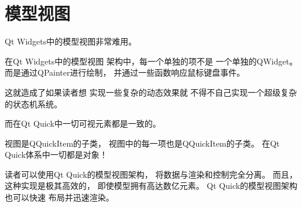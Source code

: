 ﻿




\cleardoublepage
\chapter{
模型视图
}\label{c000019}


Qt Widgets中的模型视图非常难用。

在Qt Widgets中的模型视图
架构中，每一个单独的项不是
一个单独的QWidget。
而是通过QPainter进行绘制，
并通过一些函数响应鼠标键盘事件。

这就造成了如果读者想
实现一些复杂的动态效果就
不得不自己实现一个超级复杂
的状态机系统。

而在Qt Quick中一切可视元素都是一致的。

视图是QQuickItem的子类，
视图中的每一项也是QQuickItem的子类。
在Qt Quick体系中一切都是对象！

读者可以使用Qt Quick的模型视图架构，
将数据与渲染和控制完全分离。
而且，
这种实现是极其高效的，
即使模型拥有高达数亿元素。
Qt Quick的模型视图架构也可以快速
布局并迅速渲染。














